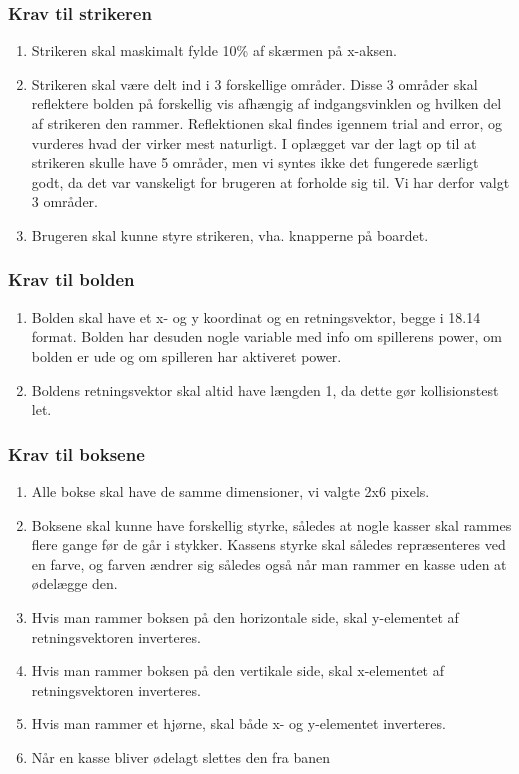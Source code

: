\subsubsection{Krav til strikeren}
\begin{enumerate}
\item Strikeren skal maskimalt fylde 10\% af skærmen på x-aksen. 
\item  Strikeren skal være delt ind i 3 forskellige områder. Disse 3 områder skal reflektere bolden på forskellig vis afhængig af indgangsvinklen og hvilken del af strikeren den rammer. Reflektionen skal findes igennem trial and error, og vurderes hvad der virker mest naturligt. I oplægget var der lagt op til at strikeren skulle have 5 områder, men vi syntes ikke det fungerede særligt godt, da det var vanskeligt for brugeren at forholde sig til. Vi har derfor valgt 3 områder.
\item Brugeren skal kunne styre strikeren, vha. knapperne på boardet.
\end{enumerate}
\subsubsection{Krav til bolden}
\label{Ballkrav}
\begin{enumerate}
\item Bolden skal have et x- og y koordinat og en retningsvektor, begge i 18.14 format. Bolden har desuden nogle variable med info om spillerens power, om bolden er ude og om spilleren har aktiveret power.
\item Boldens retningsvektor skal altid have længden 1, da dette gør kollisionstest let.

\end{enumerate}
\subsubsection{Krav til boksene}
\begin{enumerate}
\item Alle bokse skal have de samme dimensioner, vi valgte 2x6 pixels.
\item Boksene skal kunne have forskellig styrke, således at nogle kasser skal rammes flere gange før de går i stykker. Kassens styrke skal således repræsenteres ved en farve, og farven ændrer sig således også når man rammer en kasse uden at ødelægge den.
\item Hvis man rammer boksen på den horizontale side, skal y-elementet af retningsvektoren inverteres. 
\item Hvis man rammer boksen på den vertikale side, skal x-elementet af retningsvektoren inverteres.
\item Hvis man rammer et hjørne, skal både x- og y-elementet inverteres.
\item Når en kasse bliver ødelagt slettes den fra banen
\end{enumerate}


